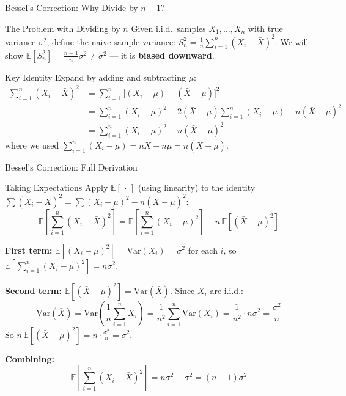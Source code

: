 \documentclass{beamer}
\begin{document}
\begin{frame}[shrink=10]{Bessel's Correction: Why Divide by $n-1$?}
  \begin{block}{The Problem with Dividing by $n$}
    Given i.i.d.\ samples $X_1,\ldots,X_n$ with true variance $\sigma^2$,
    define the naive sample variance:
    $S_n^2 = \frac{1}{n}\sum_{i=1}^n (X_i - \bar{X})^2$.
    We will show $\mathbb{E}[S_n^2] = \frac{n-1}{n}\sigma^2 \neq \sigma^2$
    --- it is \textbf{biased downward}.
  \end{block}

  \begin{block}{Key Identity}
    Expand by adding and subtracting $\mu$:
    \begin{align*}
      \sum_{i=1}^n(X_i - \bar{X})^2
        &= \sum_{i=1}^n\bigl[(X_i-\mu) - (\bar{X}-\mu)\bigr]^2\\
        &= \sum_{i=1}^n(X_i-\mu)^2
           - 2(\bar{X}-\mu)\sum_{i=1}^n(X_i-\mu)
           + n(\bar{X}-\mu)^2\\
        &= \sum_{i=1}^n(X_i-\mu)^2 - n(\bar{X}-\mu)^2
    \end{align*}
    where we used $\sum_{i=1}^n(X_i - \mu) = n\bar{X} - n\mu = n(\bar{X}-\mu)$.
  \end{block}
\end{frame}

\begin{frame}[shrink=10]{Bessel's Correction: Full Derivation}
  \begin{block}{Taking Expectations}
    Apply $\mathbb{E}[\,\cdot\,]$ (using linearity) to the identity
    $\sum(X_i-\bar{X})^2 = \sum(X_i-\mu)^2 - n(\bar{X}-\mu)^2$:
    \[
      \mathbb{E}\!\left[\sum_{i=1}^n(X_i-\bar{X})^2\right]
        = \mathbb{E}\!\left[\sum_{i=1}^n(X_i-\mu)^2\right]
          - n\,\mathbb{E}\!\left[(\bar{X}-\mu)^2\right]
    \]

    \textbf{First term:}
    $\mathbb{E}[(X_i-\mu)^2] = \mathrm{Var}(X_i) = \sigma^2$
    for each $i$, so
    $\mathbb{E}\!\left[\sum_{i=1}^n(X_i-\mu)^2\right] = n\sigma^2$.

    \medskip

    \textbf{Second term:}
    $\mathbb{E}[(\bar{X}-\mu)^2] = \mathrm{Var}(\bar{X})$.
    Since $X_i$ are i.i.d.:
    \[
      \mathrm{Var}(\bar{X})
        = \mathrm{Var}\!\left(\frac{1}{n}\sum_{i=1}^n X_i\right)
        = \frac{1}{n^2}\sum_{i=1}^n\mathrm{Var}(X_i)
        = \frac{1}{n^2}\cdot n\sigma^2
        = \frac{\sigma^2}{n}
    \]
    So $n\,\mathbb{E}[(\bar{X}-\mu)^2] = n\cdot\frac{\sigma^2}{n} = \sigma^2$.

    \medskip

    \textbf{Combining:}
    \[
      \mathbb{E}\!\left[\sum_{i=1}^n(X_i-\bar{X})^2\right]
        = n\sigma^2 - \sigma^2 = (n-1)\sigma^2
    \]
  \end{block}
\end{frame}
\end{document}
